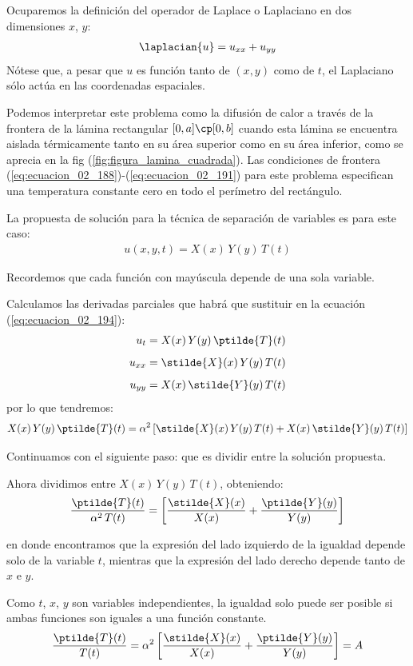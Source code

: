 Ocuparemos la definición del operador de Laplace o Laplaciano en dos dimensiones $x$, $y$:
\begin{align}
\laplacian{u} = u_{xx} + u_{yy}
\label{eq:ecuacion_02_193}
\end{align}
Nótese que, a pesar que $u$ es función tanto de $(x, y) $ como de $t$, el Laplaciano sólo actúa en las coordenadas espaciales.
\par
Podemos interpretar este problema como la difusión de calor a través de la frontera de la lámina rectangular $[ 0, a ] \cp [ 0, b ]$ cuando esta lámina se encuentra aislada térmicamente tanto en su área superior como en su área inferior, como se aprecia en la fig (\ref{fig:figura_lamina_cuadrada}). Las condiciones de frontera (\ref{eq:ecuacion_02_188})-(\ref{eq:ecuacion_02_191}) para este problema especifican una temperatura constante cero en todo el perímetro del rectángulo.
\par
La propuesta de solución para la técnica de separación de variables es para este caso:
\begin{align}
u (x, y, t) = X(x) \, Y(y) \, T(t)
\label{eq:ecuacion_02_194}
\end{align}

Recordemos que cada función con mayúscula depende de una sola variable.
\par
Calculamos las derivadas parciales que habrá que sustituir en la ecuación (\ref{eq:ecuacion_02_194}):
\begin{align*}
u_{t} &= X(x) \, Y(y) \, \ptilde{T} (t) \\[0.5em]
u_{xx} &= \stilde{X} (x) \, Y(y) \, T(t) \\[0.5em]
u_{yy} &= X(x) \, \stilde{Y} (y) \, T(t)
\end{align*}
por lo que tendremos:
\begin{align*}
X(x) \, Y(y) \, \ptilde{T} (t) = \alpha^{2} \left[ \stilde{X} (x) \, Y(y) \, T(t) + X(x) \, \stilde{Y} (y) \, T(t) \right]
\end{align*}

Continuamos con el siguiente paso: que es dividir entre la solución propuesta.
\par
Ahora dividimos entre $X(x) \, Y(y) \, T(t)$, obteniendo:
\begin{align*}
\dfrac{\ptilde{T}(t)}{\alpha^{2}  \, T(t)} = \left[ \dfrac{\stilde{X}(x)}{X(x)} + \dfrac{\ptilde{Y}(y)}{Y(y)} \right]
\end{align*}

en donde encontramos que la expresión del lado izquierdo de la igualdad depende solo de la variable $t$, mientras que la expresión del lado derecho depende tanto de $x$ e $y$.
\par
Como $t$, $x$, $y$ son variables independientes, la igualdad solo puede ser posible si ambas funciones son iguales a una función constante.
\begin{align*}
\dfrac{\ptilde{T}(t) }{T(t)} =  \alpha^{2} \left[ \dfrac{\stilde{X}(x)}{X(x)} + \dfrac{\ptilde{Y}(y)}{Y(y)} \right] = A
\end{align*}

